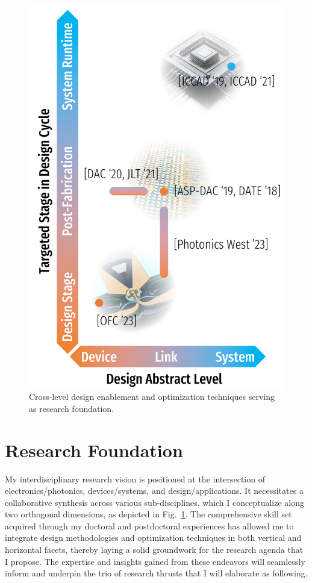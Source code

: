 \begin{figure}[!ht]%
    \includegraphics[width=\linewidth]{../../fig/research.pdf}
    \caption{Cross-level design enablement and optimization techniques serving as research foundation.}
    \label{fig:research}
\end{figure}

\section{Research Foundation}

My interdisciplinary research vision is positioned at the intersection of electronics/photonics, devices/systems, and design/applications. It necessitates a collaborative synthesis across various sub-disciplines, which I conceptualize along two orthogonal dimensions, as depicted in Fig.~\ref{fig:research}. The comprehensive skill set acquired through my doctoral and postdoctoral experiences has allowed me to integrate design methodologies and optimization techniques in both vertical and horizontal facets, thereby laying a solid groundwork for the research agenda that I propose. The expertise and insights gained from these endeavors will seamlessly inform and underpin the trio of research thrusts that I will elaborate as following.

